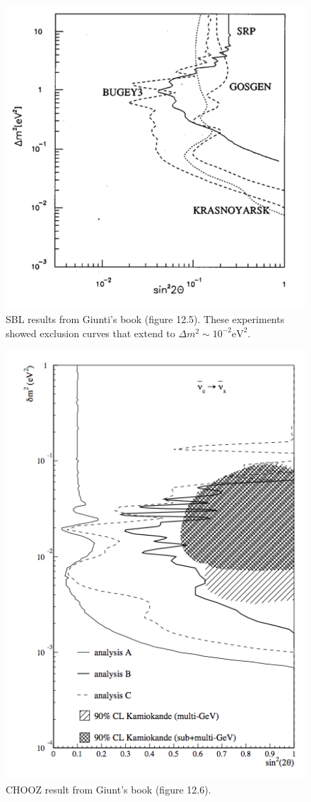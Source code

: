 \documentclass[letterpaper,12pt,english]{sphinxmanual}
\begin{document}
\begin{figure}[htbp]
\centering
\capstart

\includegraphics{sblResults.png}
\caption{SBL results from Giunti's book (figure 12.5). These experiments showed exclusion curves that extend to \(\Delta m^2\sim 10^{-2}\mathrm{eV^2}\).}\end{figure}
\begin{figure}[htbp]
\centering
\capstart

\includegraphics{choozResult.png}
\caption{CHOOZ result from Giunt's book (figure 12.6).}\end{figure}
\end{document}
